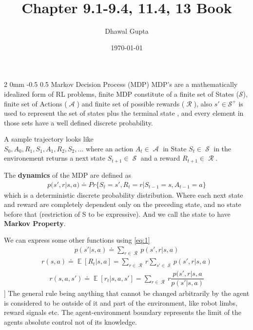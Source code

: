 \documentclass[twocolumn,11pt]{article}
\title{Chapter 9.1-9.4, 11.4, 13 Book \cite{sutton2018reinforcement}}
\author{Dhawal Gupta}
\date{\today}
\makeatletter
\DeclareMathOperator{\E}{\mathbb{E}}
\DeclareMathOperator{\State}{\mathcal{S}}
\DeclareMathOperator{\Action}{\mathcal{A}}
\DeclareMathOperator{\Reward}{\mathcal{R}}
\renewcommand{\section}{\@startsection
{section}%
{2}%
{0mm}%
{-0.5\baselineskip}%
{0.5\baselineskip}%
{\bfseries\color{blue}}} %
\makeatother
\begin{document}
\maketitle

\section{Markov Decision Process (MDP)}
MDP's are a mathematically idealized form of RL problems, finite MDP constitute of a finite set of States ($\mathcal{S}$),  finite set of Actions ($\Action$) and finite set of possible rewards ($\Reward$), also $s' \in \mathcal{S}^+$ is used to represent the set of states plus the terminal state , and every element in those sets have a well defined discrete probability. 

A sample trajectory looks like\\
$S_0, A_0, R_1, S_1, A_1, R_2, S_2, \ldots$ where an action $A_t \in \Action$ in State $S_t \in  \State$ in the environement returns a next state $S_{t+1} \in \State$ and a reward $R_{t+1} \in \Reward$.

The \textbf{dynamics} of the MDP are defined as 
\begin{align}\label{eq:1}
    p(s',r|s,a) \doteq Pr\{S_t= s', R_t = r | S_{t-1} = s, A_{t-1} = a\}
\end{align}
which is a deterministic discrete probability distribution. Where each next state and reward are completely dependent only on the preceding state, and no state before that (restriction of S to be expressive). And we call the state to have \textbf{Markov Property}. 

We can express some other functions using \ref{eq:1}\useshortskip
\begin{align}\label{eq:2}
    p(s'|s,a) \doteq \sum_{r \in \Reward}p(s', r|s, a)
\end{align}\useshortskip
\begin{align}\label{eq:3}
    r(s,a) \doteq \E[R_t | s, a] = \sum_{r \in \Reward} r \sum_{s' \in \State} p(s',r|s,a)
\end{align}\useshortskip
\begin{align}\label{eq:4}
    r(s,a,s') \doteq \E[r_t| s,a, s'] = \sum_{r \in \Reward} r \dfrac{p(s',r|s,a}{p(s'|s,a)}
\end{align}]\useshortskip
The general rule being anything that cannot be changed arbitrarily by the agent is considered to be outside of it and part of the environment, like robot limbs,  reward signals etc. The agent-environment boundary represents the limit of the agents absolute control not of its knowledge.
\end{document}
